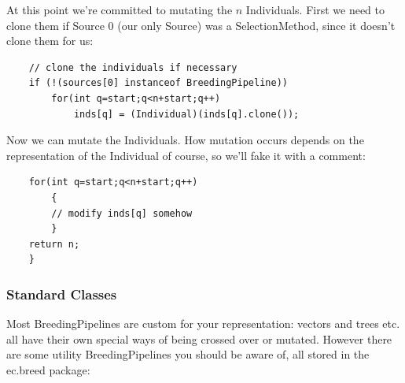 \documentclass[twoside,10pt]{book}
\newcommand\package[1]{\index{#1}\textsf{#1}}
\begin{document}
At this point we're committed to mutating the \(n\) Individuals.  First we need to clone them if Source 0 (our only Source) was a SelectionMethod, since it doesn't clone them for us:

{\small\begin{verbatim}
    // clone the individuals if necessary
    if (!(sources[0] instanceof BreedingPipeline))
        for(int q=start;q<n+start;q++)
            inds[q] = (Individual)(inds[q].clone());
\end{verbatim}}

Now we can mutate the Individuals.  How mutation occurs depends on the representation of the Individual of course, so we'll fake it with a comment:

{\small\begin{verbatim}
    for(int q=start;q<n+start;q++)
        {
        // modify inds[q] somehow
        }
    return n;
    }
\end{verbatim}}


\subsubsection{Standard Classes}

Most BreedingPipelines are custom for your representation: vectors and trees etc. all have their own special ways of being crossed over or mutated.  However there are some utility BreedingPipelines you should be aware of, all stored in the \package{ec.breed} package:
\end{document}
